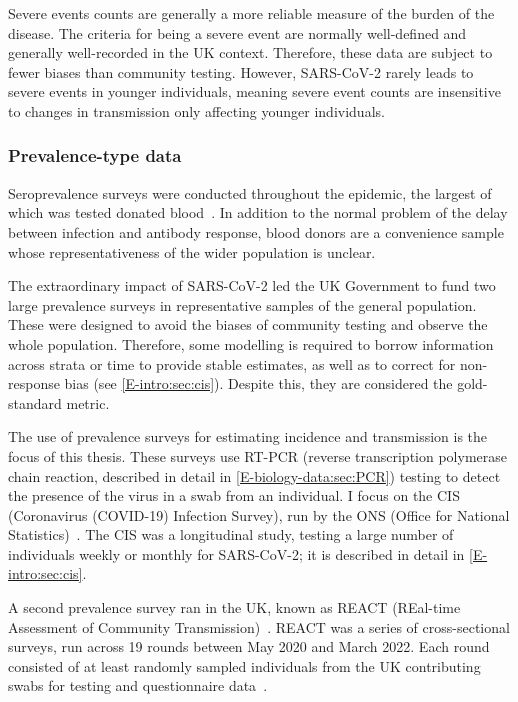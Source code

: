 \documentclass[thesis.tex]{subfiles}
\begin{document}
Severe events counts are generally a more reliable measure of the burden of the disease.
The criteria for being a severe event are normally well-defined and generally well-recorded in the UK context.
Therefore, these data are subject to fewer biases than community testing.
However, SARS-CoV-2 rarely leads to severe events in younger individuals, meaning severe event counts are insensitive to changes in transmission only affecting younger individuals.

\subsubsection{Prevalence-type data}

Seroprevalence surveys were conducted throughout the epidemic, the largest of which was tested donated blood~\autocite{amirthalingamSeroprevalence}.
In addition to the normal problem of the delay between infection and antibody response, blood donors are a convenience sample whose representativeness of the wider population is unclear.

The extraordinary impact of SARS-CoV-2 led the UK Government to fund two large prevalence surveys in representative samples of the general population.
These were designed to avoid the biases of community testing and observe the whole population.
Therefore, some modelling is required to borrow information across strata or time to provide stable estimates, as well as to correct for non-response bias (see \cref{E-intro:sec:cis}).
Despite this, they are considered the gold-standard metric.

The use of prevalence surveys for estimating incidence and transmission is the focus of this thesis.
These surveys use RT-PCR (reverse transcription polymerase chain reaction, described in detail in \cref{E-biology-data:sec:PCR}) testing to detect the presence of the virus in a swab from an individual.
I focus on the CIS (Coronavirus (COVID-19) Infection Survey), run by the ONS (Office for National Statistics)~\autocite{CIS,cisMethodsONS}.
The CIS was a longitudinal study, testing a large number of individuals weekly or monthly for SARS-CoV-2; it is described in detail in \cref{E-intro:sec:cis}.

A second prevalence survey ran in the UK, known as REACT (REal-time Assessment of Community Transmission)~\autocite{rileyResurgence,rileyREACT}.
REACT was a series of cross-sectional surveys, run across 19 rounds between May 2020 and March 2022.
Each round consisted of at least  randomly sampled individuals from the UK contributing swabs for testing and questionnaire data~\autocite{elliottTwin}.
\end{document}

